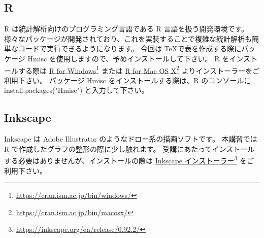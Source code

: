 \documentclass[TeXworkshop]{subfiles}
\begin{document}
\subsection*{R}
R は統計解析向けのプログラミング言語である R 言語を扱う開発環境です。
様々なパッケージが開発されており、これを実装することで複雑な統計解析も簡単なコードで実行できるようになります。
今回は \TeX で表を作成する際にパッケージ Hmisc を使用しますので、予めインストールして下さい。
R をインストールする際は \href{https://cran.ism.ac.jp/bin/windows/}{R for Windows}\footnote{\url{https://cran.ism.ac.jp/bin/windows/}} または \href{https://cran.ism.ac.jp/bin/macosx/}{R for Mac OS X}\footnote{\url{https://cran.ism.ac.jp/bin/macosx/}} よりインストーラーをご利用下さい。
パッケージ Hmisc をインストールする際は、R のコンソールに install.packages("Hmisc") と入力して下さい。





\subsection*{Inkscape}
Inkscape は Adobe Illustrator のようなドロー系の描画ソフトです。
本講習では R で作成したグラフの整形の際に少し触れます。
受講にあたってインストールする必要はありませんが、インストールの際は \href{https://inkscape.org/en/release/0.92.2/}{Inkscape インストーラー}\footnote{\url{https://inkscape.org/en/release/0.92.2/}} をご利用下さい。
\end{document}
